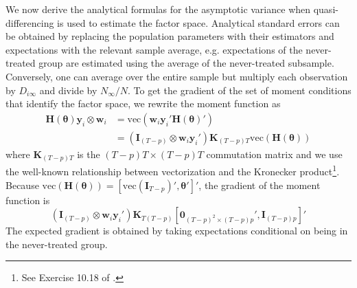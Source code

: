 \documentclass[12pt]{article}
\begin{document}
We now derive the analytical formulas for the asymptotic variance when quasi-differencing is used to estimate the factor space. Analytical standard errors can be obtained by replacing the population parameters with their estimators and expectations with the relevant sample average, e.g. expectations of the never-treated group are estimated using the average of the never-treated subsample. Conversely, one can average over the entire sample but multiply each observation by $D_{i\infty}$ and divide by $N_{\infty} / N$. To get the gradient of the set of moment conditions that identify the factor space, we rewrite the moment function as 
\begin{align*}
    \bm H(\bm \theta) \bm y_i \otimes \bm w_i
    &= \text{vec}(\bm w_i \bm y_i' \bm H(\bm \theta)')\\
    &= (\bm I_{(T-p)} \otimes \bm w_i \bm y_i') \bm K_{(T-p)T} \text{vec}(\bm H(\bm \theta))
\end{align*}
where $\bm K_{(T-p)T}$ is the $(T-p)T \times (T-p)T$ commutation matrix and we use the well-known relationship between vectorization and the Kronecker product\footnote{See Exercise 10.18 of \citet{abadir2005matrix}.}. Because $\text{vec}(\bm H(\bm \theta)) = [\text{vec}(\bm I_{T-p})', \bm \theta']'$, the gradient of the moment function is 
\begin{equation}
    \left( \bm I_{(T-p)} \otimes \bm w_i \bm y_i' \right) \bm K_{T(T-p)} [\bm 0_{(T-p)^2 \times (T-p)p}', \bm I_{(T-p)p}]'
\end{equation}
The expected gradient is obtained by taking expectations conditional on being in the never-treated group.
\end{document}

